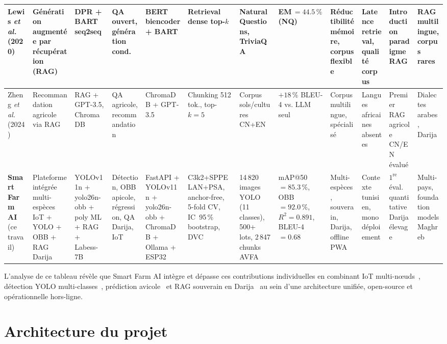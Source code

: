 \begin{table}[H]
{\begin{tabular}{p{2.2cm}p{2.8cm}p{2.4cm}p{1.8cm}p{2.6cm}p{2.5cm}
                p{2.2cm}p{2.2cm}p{2.4cm}p{2.4cm}p{2.6cm}p{2.4cm}}
Lewis \textit{et al.}~\cite{lewis2020rag}\,(2020) &
Génération augmentée par récupération (RAG) &
DPR + BART seq2seq &
QA ouvert, génération cond. &
BERT biencoder + BART &
Retrieval dense top-$k$ &
NaturalQuestions, TriviaQA &
EM\,$=44.5\,\%$ (NQ) &
Réductibilité mémoire, corpus flexible &
Latence retrieval, qualité corpus &
Introduction paradigme RAG &
RAG multilingue, corpus rares \\
\midrule

Zheng \textit{et al.}~\cite{zheng2024rag_agri}\,(2024) &
Recommandation agricole via RAG &
RAG + GPT-3.5, ChromaDB &
QA agricole, recommandation &
ChromaDB + GPT-3.5 &
Chunking 512 tok., top-$k=5$ &
Corpus sols/cultures CN+EN &
$+18\,\%$ BLEU-4 vs. LLM seul &
Corpus multilingue, spécialisé &
Langues africaines absentes &
Premier RAG agricole CN/EN évalué &
Dialectes arabes, Darija \\
\midrule

\textbf{Smart Farm AI} (ce travail) &
Plateforme intégrée multi-espèces IoT + YOLO + OBB + RAG Darija &
YOLOv11n + yolo26n-obb + poly ML + RAG + Labess-7B &
Détection, OBB apicole, régression, QA Darija, IoT &
FastAPI + YOLOv11n + yolo26n-obb + ChromaDB + Ollama + ESP32 &
C3k2+SPPELAN+PSA, anchor-free, 5-fold CV, IC~95\,\% bootstrap, DVC &
14\,820 images YOLO (11 classes), 500+ lots, 2\,847 chunks AVFA &
mAP@50\,$=85.3\,\%$, OBB\,$=92.0\,\%$, $R^2=0.891$, BLEU-4\,$=0.68$ &
Multi-espèces, souverain, Darija, offline PWA &
Contexte tunisien, monodéploiement &
$1^\text{re}$ éval. quantitative Darija élevage &
Multi-pays, foundation models Maghreb \\

\bottomrule
\end{tabular}
}%
\end{table}

\medskip

L'analyse de ce tableau révèle que Smart Farm AI intègre et dépasse ces contributions
individuelles en combinant IoT multi-nœuds~\cite{sharma2024smart}, détection YOLO
multi-classes~\cite{chen2023yolo_livestock}, prédiction avicole~\cite{zhang2023fcr}
et RAG souverain en Darija~\cite{zheng2024rag_agri} au sein d'une architecture unifiée,
open-source et opérationnelle hors-ligne.

\section{Architecture du projet}

